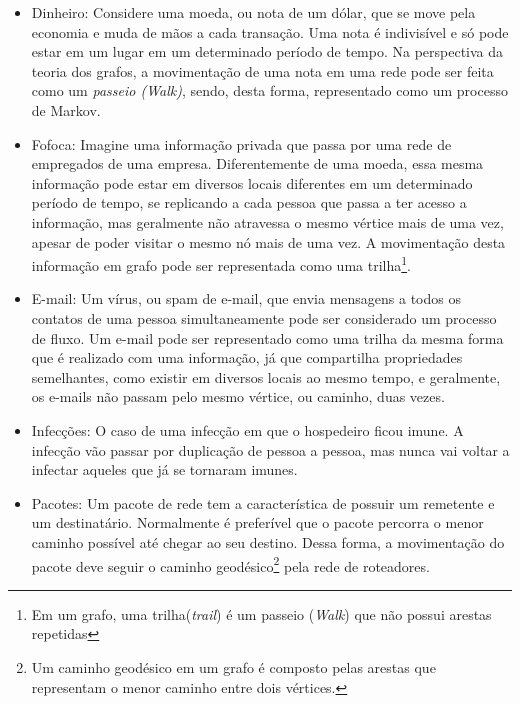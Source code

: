 \begin{itemize}
\item Dinheiro: Considere uma moeda, ou nota de um dólar, que se move pela economia e muda de mãos a cada transação. Uma nota é indivisível e só pode estar em um lugar em um determinado período de tempo. Na perspectiva da teoria dos grafos, a movimentação de uma nota em uma rede pode ser feita como um \textit{passeio (Walk)}, sendo, desta forma, representado como um processo de Markov.
\item Fofoca: Imagine uma informação privada que passa por uma rede de empregados de uma empresa. Diferentemente de uma moeda, essa mesma informação pode estar em diversos locais diferentes em um determinado período de tempo, se replicando a cada pessoa que passa a ter acesso a informação, mas geralmente não atravessa o mesmo vértice mais de uma vez, apesar de poder visitar o mesmo nó mais de uma vez. A movimentação desta informação em grafo pode ser representada como uma trilha\footnote{Em um grafo, uma trilha(\textit{trail}) é um passeio (\textit{Walk}) que não possui arestas repetidas}.
\item E-mail: Um vírus, ou spam de e-mail, que envia mensagens a todos os contatos de uma pessoa simultaneamente pode ser considerado um processo de fluxo. Um e-mail pode ser representado como uma trilha da mesma forma que é realizado com uma informação, já que compartilha propriedades semelhantes, como existir em diversos locais ao mesmo tempo, e geralmente, os e-mails não passam pelo mesmo vértice, ou caminho, duas vezes.
\item Infecções: O caso de uma infecção em que o hospedeiro ficou imune.
A infecção vão passar por duplicação de pessoa a pessoa, mas nunca vai voltar a infectar aqueles que já se tornaram imunes.
\item Pacotes: Um pacote de rede tem a característica de possuir um remetente e um destinatário. Normalmente é preferível que o pacote percorra o menor caminho possível até chegar ao seu destino. Dessa forma, a movimentação do pacote deve seguir o caminho geodésico\footnote{Um caminho geodésico em um grafo é composto pelas arestas que representam o menor caminho entre dois vértices.} pela rede de roteadores. 
\end{itemize}


